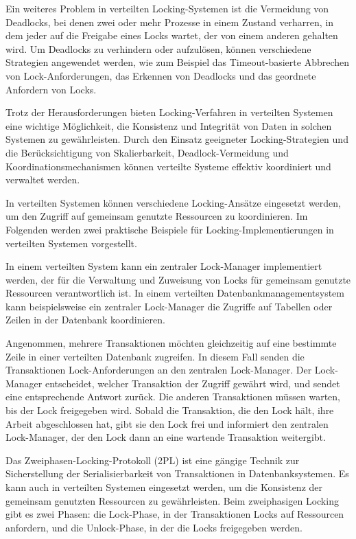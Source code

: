 Ein weiteres Problem in verteilten Locking-Systemen ist die Vermeidung von Deadlocks, bei denen zwei oder mehr Prozesse in einem Zustand verharren, in dem jeder auf die Freigabe eines Locks wartet, der von einem anderen gehalten wird. Um Deadlocks zu verhindern oder aufzulösen, können verschiedene Strategien angewendet werden, wie zum Beispiel das Timeout-basierte Abbrechen von Lock-Anforderungen, das Erkennen von Deadlocks und das geordnete Anfordern von Locks.

Trotz der Herausforderungen bieten Locking-Verfahren in verteilten Systemen eine wichtige Möglichkeit, die Konsistenz und Integrität von Daten in solchen Systemen zu gewährleisten. Durch den Einsatz geeigneter Locking-Strategien und die Berücksichtigung von Skalierbarkeit, Deadlock-Vermeidung und Koordinationsmechanismen können verteilte Systeme effektiv koordiniert und verwaltet werden.

In verteilten Systemen können verschiedene Locking-Ansätze eingesetzt werden, um den Zugriff auf gemeinsam genutzte Ressourcen zu koordinieren. Im Folgenden werden zwei praktische Beispiele für Locking-Implementierungen in verteilten Systemen vorgestellt.


In einem verteilten System kann ein zentraler Lock-Manager implementiert werden, der für die Verwaltung und Zuweisung von Locks für gemeinsam genutzte Ressourcen verantwortlich ist. In einem verteilten Datenbankmanagementsystem kann beispielsweise ein zentraler Lock-Manager die Zugriffe auf Tabellen oder Zeilen in der Datenbank koordinieren.

Angenommen, mehrere Transaktionen möchten gleichzeitig auf eine bestimmte Zeile in einer verteilten Datenbank zugreifen. In diesem Fall senden die Transaktionen Lock-Anforderungen an den zentralen Lock-Manager. Der Lock-Manager entscheidet, welcher Transaktion der Zugriff gewährt wird, und sendet eine entsprechende Antwort zurück. Die anderen Transaktionen müssen warten, bis der Lock freigegeben wird. Sobald die Transaktion, die den Lock hält, ihre Arbeit abgeschlossen hat, gibt sie den Lock frei und informiert den zentralen Lock-Manager, der den Lock dann an eine wartende Transaktion weitergibt.

Das Zweiphasen-Locking-Protokoll (2PL) ist eine gängige Technik zur Sicherstellung der Serialisierbarkeit von Transaktionen in Datenbanksystemen. Es kann auch in verteilten Systemen eingesetzt werden, um die Konsistenz der gemeinsam genutzten Ressourcen zu gewährleisten. Beim zweiphasigen Locking gibt es zwei Phasen: die Lock-Phase, in der Transaktionen Locks auf Ressourcen anfordern, und die Unlock-Phase, in der die Locks freigegeben werden.

